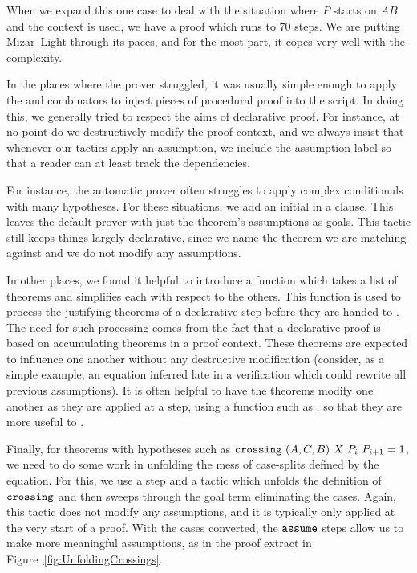 When we expand this one case to deal with the situation where $P$ starts on $AB$ and the context is used, we have a proof which runs to 70 steps. We are putting Mizar~Light through its paces, and for the most part, it copes very well with the complexity.

In the places where the prover struggled, it was usually simple enough to apply the  and  combinators to inject pieces of procedural proof into the script. In doing this, we generally tried to respect the aims of declarative proof. For instance, at no point do we destructively modify the proof context, and we always insist that whenever our tactics apply an assumption, we include the assumption label so that a reader can at least track the dependencies.

For instance, the automatic prover often struggles to apply complex conditionals with many hypotheses. For these situations, we add an initial  in a  clause. This leaves the default prover  with just the theorem's assumptions as goals. This tactic still keeps things largely declarative, since we name the theorem we are matching against and we do not modify any assumptions. 

In other places, we found it helpful to introduce a function  which takes a list of theorems and simplifies each with respect to the others. This function is used to process the justifying theorems of a declarative step before they are handed to . The need for such processing comes from the fact that a declarative proof is based on accumulating theorems in a proof context. These theorems are expected to influence one another without any destructive modification (consider, as a simple example, an equation inferred late in a verification which could rewrite all previous assumptions). It is often helpful to have the theorems modify one another as they are applied at a step, using a function such as , so that they are more useful to .

Finally, for theorems with hypotheses such as $\texttt{crossing}\ (A,C,B)\ X\ P_i\ P_{i+1} = 1$, we need to do some work in unfolding the mess of case-splits defined by the equation. For this, we use a  step and a tactic  which unfolds the definition of $\texttt{crossing}$ and then sweeps through the goal term eliminating the cases. Again, this tactic does not modify any assumptions, and it is typically only applied at the very start of a proof. With the cases converted, the $\texttt{assume}$ steps allow us to make more meaningful assumptions, as in the proof extract in Figure~\ref{fig:UnfoldingCrossings}.


